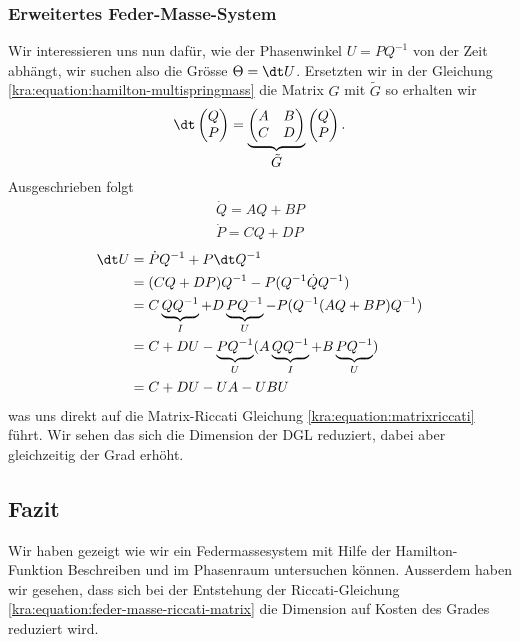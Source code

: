 \subsubsection{Erweitertes Feder-Masse-System}
Wir interessieren uns nun dafür, wie der Phasenwinkel $U = PQ^{-1}$ von der Zeit abhängt,
wir suchen also die Grösse $\Theta = \dt U$.
Ersetzten wir in der Gleichung \eqref{kra:equation:hamilton-multispringmass} die Matrix $G$ mit $\tilde{G}$ so erhalten wir
\begin{equation}
    \dt
    \begin{pmatrix}
        Q \\
        P
    \end{pmatrix}
    =
    \underbrace{
        \begin{pmatrix}
            A & B \\
            C & D
        \end{pmatrix}
    }_{\displaystyle{\tilde{G}}}
    \begin{pmatrix}
        Q \\
        P
    \end{pmatrix}.
\end{equation}
Ausgeschrieben folgt
\begin{align*}
    \dot{Q} = AQ + BP \\
    \dot{P} = CQ + DP
\end{align*}
\begin{equation}
    \label{kra:equation:feder-masse-riccati-matrix}
    \begin{split}
        \dt U   &= \dot{P} Q^{-1} + P \dt Q^{-1} \\
        &= (CQ + DP) Q^{-1} - P (Q^{-1} \dot{Q} Q^{-1}) \\
        &= C\underbrace{QQ^{-1}}_\text{$I$} + D\underbrace{PQ^{-1}}_\text{$U$} - P(Q^{-1} (AQ + BP) Q^{-1}) \\
        &= C + DU - \underbrace{PQ^{-1}}_\text{$U$}(A\underbrace{QQ^{-1}}_\text{$I$} + B\underbrace{PQ^{-1}}_\text{$U$}) \\
        &= C  + DU - UA - UBU
    \end{split}
\end{equation}
was uns direkt auf die Matrix-Riccati Gleichung \eqref{kra:equation:matrixriccati} führt.
Wir sehen das sich die Dimension der DGL reduziert, dabei aber gleichzeitig der Grad erhöht.

\subsection{Fazit}
Wir haben gezeigt wie wir ein Federmassesystem mit Hilfe der Hamilton-Funktion Beschreiben und im Phasenraum untersuchen können.
Ausserdem haben wir gesehen, dass sich bei der Entstehung der Riccati-Gleichung \eqref{kra:equation:feder-masse-riccati-matrix} die Dimension auf Kosten des Grades reduziert wird.